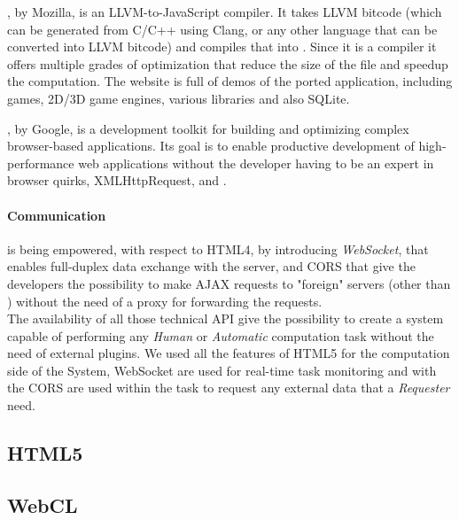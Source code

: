 , by Mozilla, is an LLVM-to-JavaScript compiler. It takes
LLVM bitcode (which can be generated from C/C++ using Clang, or any other
language that can be converted into LLVM bitcode) and compiles that into \js{}.
Since it is a compiler it offers multiple grades of optimization that reduce the
size of the \js{} file and speedup the computation. The website is full of demos
of the ported application, including games, 2D/3D game engines, various libraries
and also SQLite.

, by Google, is a development toolkit for building and optimizing
complex browser-based applications. Its goal is to enable productive development
of high-performance web applications without the developer having to be an expert
in browser quirks, XMLHttpRequest, and \js{}.\\



\paragraph{Communication} is being empowered, with respect to HTML4, by
introducing \emph{WebSocket}, that enables full-duplex data exchange with the
server, and \ac{CORS} that give the developers the possibility to make \ac{AJAX}
requests to "foreign" servers (other than ) without the need of
a proxy for forwarding the requests.\\


The availability of all those technical API give the possibility to create a
system capable of performing any \emph{Human} or \emph{Automatic} computation
task without the need of external plugins. We used all the features of HTML5
for the computation side of the System, WebSocket are used for real-time task
monitoring and with the \ac{CORS} are used within the task to request any
external data that a \emph{Requester} need.

\subsection{\acs{HTML}5}
\label{sec:bg:web:html5}



\subsection{WebCL}
\label{sec:bg:web:webcl}
